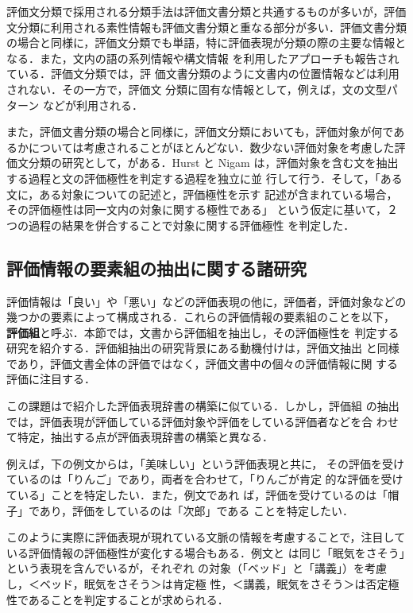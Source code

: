 評価文分類で採用される分類手法は評価文書分類と共通するものが多いが，評価
文分類に利用される素性情報も評価文書分類と重なる部分が多い．評価文書分類
の場合と同様に，評価文分類でも単語，特に評価表現が分類の際の主要な情報と
なる．また，文内の語の系列情報\cite{osajima2005a}や構文情報
\cite{kudo2003a}を利用したアプローチも報告されている．評価文分類では，評
価文書分類のように文書内の位置情報などは利用されない．その一方で，評価文
分類に固有な情報として，例えば，文の文型パターン
\cite{murano2003a,touge2004a}などが利用される．

また，評価文書分類の場合と同様に，評価文分類においても，評価対象が何であ
るかについては考慮されることがほとんどない．数少ない評価対象を考慮した評
価文分類の研究として，\cite{hurst2004a,nigam2004a}がある．Hurst と Nigam 
は，評価対象を含む文を抽出する過程と文の評価極性を判定する過程を独立に並
行して行う．そして，「ある文に，ある対象についての記述と，評価極性を示す
記述が含まれている場合，その評価極性は同一文内の対象に関する極性である」
という仮定に基いて，２つの過程の結果を併合することで対象に関する評価極性
を判定した．

\subsection{評価情報の要素組の抽出に関する諸研究}
\label{sec:ie}

評価情報は「良い」や「悪い」などの評価表現の他に，評価者，評価対象などの
幾つかの要素によって構成される．これらの評価情報の要素組のことを以下，
\textbf{評価組}と呼ぶ．本節では，文書から評価組を抽出し，その評価極性を
判定する研究を紹介する．評価組抽出の研究背景にある動機付けは，評価文抽出
と同様であり，評価文書全体の評価ではなく，評価文書中の個々の評価情報に関
する評価に注目する．

この課題はで紹介した評価表現辞書の構築に似ている．しかし，評価組
の抽出では，評価表現が評価している評価対象や評価をしている評価者などを合
わせて特定，抽出する点が評価表現辞書の構築と異なる．

例えば，下の例文からは，「美味しい」という評価表現と共に，
その評価を受けているのは「りんご」であり，両者を合わせて，「りんごが肯定
的な評価を受けている」ことを特定したい．また，例文であれ
ば，評価を受けているのは「帽子」であり，評価をしているのは「次郎」である
ことを特定したい．

このように実際に評価表現が現れている文脈の情報を考慮することで，注目して
いる評価情報の評価極性が変化する場合もある．例文と
は同じ「眠気をさそう」という表現を含んでいるが，それぞれ
の対象（「ベッド」と「講義」）を考慮し，＜ベッド，眠気をさそう＞は肯定極
性，＜講義，眠気をさそう＞は否定極性であることを判定することが求められる．

